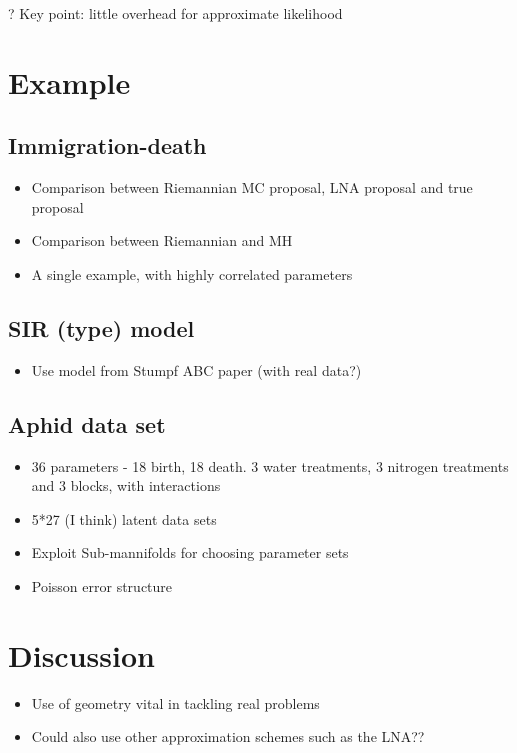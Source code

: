 \documentclass[useAMS,usenatbib,referee]{example/biom}
\begin{document}
?
Key point: little overhead for approximate likelihood


\section{Example}

\subsection{Immigration-death}

\begin{itemize}
\item Comparison between Riemannian MC proposal, LNA proposal and true proposal
\item Comparison between Riemannian and MH
\item A single example, with highly correlated parameters
\end{itemize}

\subsection{SIR (type) model}

\begin{itemize}
\item Use model from Stumpf ABC paper (with real data?)
\end{itemize}

\subsection{Aphid data set}

\begin{itemize}
\item 36 parameters - 18 birth, 18 death. 3 water treatments, 3 nitrogen treatments and 3 blocks, with interactions
\item 5*27 (I think) latent data sets
\item Exploit Sub-mannifolds for choosing parameter sets
\item Poisson error structure
\end{itemize}


\section{Discussion}

\begin{itemize}
\item Use of geometry vital in tackling real problems
\item Could also use other approximation schemes such as the LNA??
\end{itemize}
\end{document}
